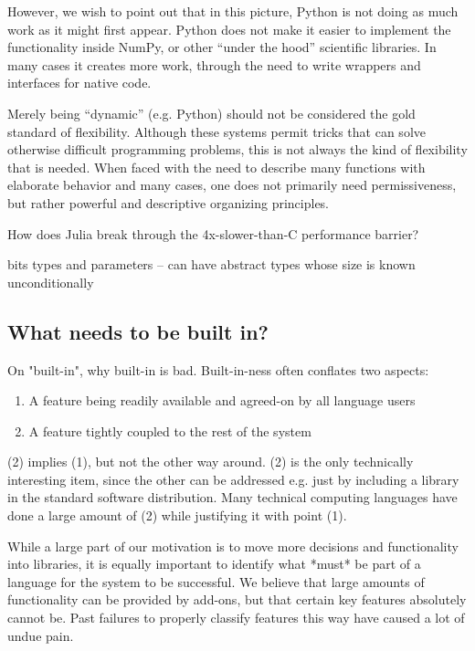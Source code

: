 {However, we wish to point out that in this picture, Python is not
doing as much work as it might first appear. Python does not make
it easier to implement the functionality inside NumPy, or other
``under the hood'' scientific libraries. In many cases it creates
more work, through the need to write wrappers and interfaces
for native code.


Merely being ``dynamic'' (e.g. Python) should not be considered
the gold standard of flexibility. Although these systems permit
tricks that can solve otherwise difficult programming problems,
this is not always the kind of flexibility that is needed.
When faced with the need to describe many functions with elaborate
behavior and many cases, one does not primarily need permissiveness,
but rather powerful and descriptive organizing principles.



How does Julia break through the 4x-slower-than-C performance barrier?

bits types and parameters -- can have abstract types whose size is known
unconditionally




\subsection{What needs to be built in?}

On "built-in", why built-in is bad. Built-in-ness often conflates two
aspects:

\begin{enumerate}
\item A feature being readily available and agreed-on by all language users
\item A feature tightly coupled to the rest of the system
\end{enumerate}

(2) implies (1), but not the other way around. (2) is the only technically
interesting item, since the other can be addressed e.g. just by including
a library in the standard software distribution. Many technical computing
languages have done a large amount of (2) while justifying it with point (1).



While a large part of our motivation is to move more decisions and functionality
into libraries, it is equally important to identify what *must* be part of a
language for the system to be successful. We believe that large amounts of
functionality can be provided by add-ons, but that certain key features
absolutely cannot be. Past failures to properly classify features this way have
caused a lot of undue pain.

}

